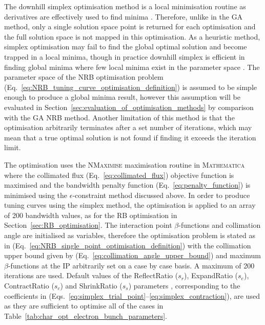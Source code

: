 \documentclass[../main.tex]{subfiles}
\begin{document}
The downhill simplex optimisation method is a local minimisation routine as derivatives are effectively used to find minima \cite{jones2016design}. Therefore, unlike in the GA method, only a single solution space point is returned for each optimisation and the full solution space is not mapped in this optimisation. As a heuristic method, simplex optimisation may fail to find the global optimal solution and become trapped in a local minima, though in practice downhill simplex is efficient in finding global minima where few local minima exist in the parameter space \cite{wolfram2021nmaximize}. The parameter space of the NRB optimisation problem (Eq.~\ref{eq:NRB_tuning_curve_optimisation_definition}) is assumed to be simple enough to produce a global minima result, however this assumption will be evaluated in Section~\ref{sec:evaluation_of_optimisation_methods} by comparison with the GA NRB method. Another limitation of this method is that the optimisation arbitrarily terminates after a set number of iterations, which may mean that a true optimal solution is not found if finding it exceeds the iteration limit.

The optimisation uses the \textsc{NMaximise} maximisation routine in \textsc{Mathematica} \cite{wolfram2021nmaximize} where the collimated flux (Eq.~\ref{eq:collimated_flux}) objective function is maximised and the bandwidth penalty function (Eq.~\ref{eq:penalty_function}) is minimised using the $\epsilon$-constraint method discussed above. In order to produce tuning curves using the simplex method, the optimisation is applied to an array of 200 bandwidth values, as for the RB optimisation in Section~\ref{sec:RB_optimisation}. The interaction point $\beta$-functions and collimation angle are initialised as variables, therefore the optimisation problem is stated as in (Eq.~\ref{eq:NRB_single_point_optimisation_definition}) with the collimation upper bound given by (Eq.~\ref{eq:collimation_angle_upper_bound}) and maximum $\beta$-functions at the IP arbitrarily set on a case by case basis. A maximum of 200 iterations are used. Default values of the ReflectRatio ($s_{r}$), ExpandRatio ($s_{e}$), ContractRatio ($s_{c}$) and ShrinkRatio ($s_{s}$) parameters \cite{wolfram2021nmaximize}, corresponding to the coefficients in (Eqs.~\ref{eq:simplex_trial_point}--\ref{eq:simplex_contraction}), are used as they are sufficient to optimise all of the cases in Table~\ref{tab:char_opt_electron_bunch_parameters}.
\end{document}
